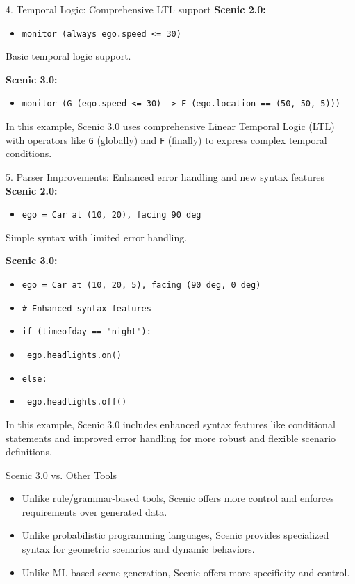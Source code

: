 \documentclass[10pt]{beamer}
\begin{document}
\begin{frame}{4. Temporal Logic: Comprehensive LTL support}
\textbf{Scenic 2.0:}
\begin{itemize}
    \item \texttt{monitor (always ego.speed <= 30)}
\end{itemize}

Basic temporal logic support.

\textbf{Scenic 3.0:}
\begin{itemize}
    \item \texttt{monitor (G (ego.speed <= 30) -> F (ego.location == (50, 50, 5)))}
\end{itemize}

In this example, Scenic 3.0 uses comprehensive Linear Temporal Logic (LTL) with operators like \texttt{G} (globally) and \texttt{F} (finally) to express complex temporal conditions.
\end{frame}

\begin{frame}{5. Parser Improvements: Enhanced error handling and new syntax features}
\textbf{Scenic 2.0:}
\begin{itemize}
    \item \texttt{ego = Car at (10, 20), facing 90 deg}
\end{itemize}

Simple syntax with limited error handling.

\textbf{Scenic 3.0:}
\begin{itemize}
    \item \texttt{ego = Car at (10, 20, 5), facing (90 deg, 0 deg)}
    \item \texttt{\# Enhanced syntax features}
    \item \texttt{if (timeofday == "night"):}
    \item \texttt{    ego.headlights.on()}
    \item \texttt{else:}
    \item \texttt{    ego.headlights.off()}
\end{itemize}

In this example, Scenic 3.0 includes enhanced syntax features like conditional statements and improved error handling for more robust and flexible scenario definitions.
\end{frame}

\begin{frame}{Scenic 3.0 vs. Other Tools}
    \begin{itemize}
        \item Unlike rule/grammar-based tools, Scenic offers more control and enforces requirements over generated data.
        \item Unlike probabilistic programming languages, Scenic provides specialized syntax for geometric scenarios and dynamic behaviors.
        \item Unlike ML-based scene generation, Scenic offers more specificity and control.
    \end{itemize}
\end{frame}
\end{document}
